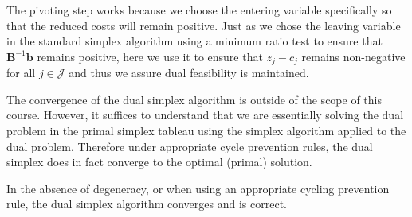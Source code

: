 The pivoting step works because we choose the entering variable specifically so that the reduced costs will remain positive. Just as we chose the leaving variable in the standard simplex algorithm using a minimum ratio test to ensure that $\mathbf{B}^{-1}\mathbf{b}$ remains positive, here we use it to ensure that $z_j - c_j$ remains non-negative for all $j \in \mathcal{J}$ and thus we assure dual feasibility is maintained.

The convergence of the dual simplex algorithm is outside of the scope of this course. However, it suffices to understand that we are essentially solving the dual problem in the primal simplex tableau using the simplex algorithm applied to the dual problem. Therefore under appropriate cycle prevention rules, the dual simplex does in fact converge to the optimal (primal) solution. 

\begin{theorem} In the absence of degeneracy, or when using an appropriate cycling prevention rule, the dual simplex algorithm converges and is correct.
\end{theorem}

